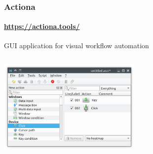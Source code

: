 \documentclass{beamer}
\begin{document}
    \begin{frame}
        \frametitle{Actiona}
        \framesubtitle{\url{https://actiona.tools/}}

        GUI application for visual workflow automation

        \begin{columns}

            \begin{column}{7cm}
                \includegraphics[width=7cm]{Images/actiona_screenshot.png}
            \end{column}
        \end{columns}
    \end{frame}
\end{document}
